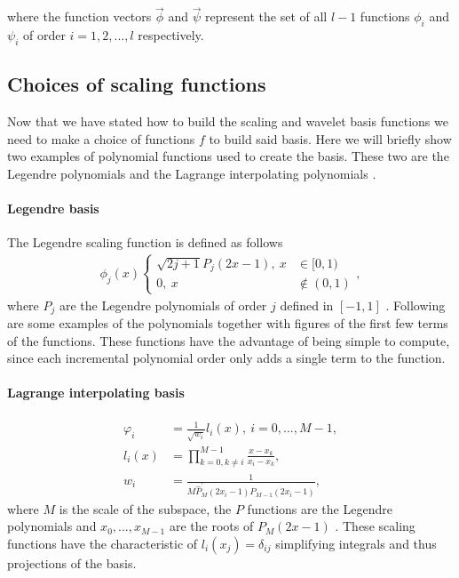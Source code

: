 \documentclass[../master_thesis.tex]{subfiles}
\begin{document}
where the function vectors $\vec{\phi}$ and $\vec{\psi}$ represent the set of
all $l-1$ functions $\phi_i$ and $\psi_i$ of order $i = 1, 2, ..., l$ respectively.

\subsection{Choices of scaling functions }
Now that we have stated how to build the scaling and wavelet basis functions
we need to make a choice of functions $f$ to build said basis.
Here we will briefly show two examples of polynomial functions used to create the
basis. These two are the Legendre polynomials and the Lagrange interpolating
polynomials \cite{Beylkin:MRA, Beylkin1999AdaptiveSO}.

\paragraph{Legendre basis}
The Legendre scaling function is defined as follows
\begin{align}
  \phi_j(x)
  \begin{cases}
    \sqrt{2j+1} P_j(2x-1), \ x&\in [0,1)\\
    0,\ x&\notin (0, 1)
  \end{cases},
\end{align}
where $P_j$ are the Legendre polynomials of order $j$ defined in $[-1, 1]$ \cite{Beylkin:MRA}.
Following are some examples of the polynomials together with figures of the first few terms
of the functions. These functions have the advantage of being simple to compute,
since each incremental polynomial order only adds a single term to the function.

\paragraph{Lagrange interpolating basis}
  \begin{align}
    \varphi_i &= \frac{1}{\sqrt{w_i}}l_i(x), \ i = 0, ..., M-1,\\
    l_i(x) &= \prod^{M-1}_{k = 0, k\neq i} \frac{x-x_k}{x_i-x_k}, \\
    w_i &= \frac{1}{M\hat{P}^\prime_M(2x_i-1)P_{M-1}(2x_i-1)},
  \end{align}
where $M$ is the scale of the subspace, the $P$ functions are the Legendre polynomials and
$x_0, ..., x_{M-1}$ are the roots of $P_M(2x-1)$ \cite{Beylkin:MRA}.
These scaling functions have the characteristic of $l_i(x_j)=\delta_{ij}$ simplifying
integrals and thus projections of the basis.
\end{document}
